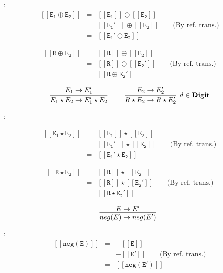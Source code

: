 \documentclass[a4paper,10pt]{article}
\newcommand{\Digit}{\mathbf{Digit}}
\newcommand{\denot}[1]{\mathtt{[[{#1}]]}}
\begin{document}
\begin{enumerate}
\proof:
\begin{eqnarray*}
\denot{E_{1} \oplus E_{2}}  
            & = &  \denot{E_{1}} \oplus \denot{E_{2}} \\
            & = &  \denot{E_{1}'} \oplus \denot{E_{2}}  
            \qquad \text{(By ref. trans.)}
            \\ 
            & = & \denot{E_{1}' \oplus E_{2}} 
\end{eqnarray*}

\begin{eqnarray*}
\denot{R \oplus E_{2}}  
            & = &  \denot{R} \oplus \denot{E_{2}} \\
            & = &  \denot{R} \oplus \denot{E_{2}'}  
            \qquad \text{(By ref. trans.)} \\
            & = & \denot{{R} \oplus E_{2}'} 
\end{eqnarray*}

\[
\infer[]
  {E_{1} \star E_{2} \rightarrow E_{1}' \star E_{2}}
  {E_{1} \rightarrow E_{1}'} \qquad
\infer[d \in \Digit]
  {R \star E_{2} \rightarrow R \star E_{2}'}
  {E_{2} \rightarrow E_{2}'}
\]

\proof:

\begin{eqnarray*}
\denot{E_{1} \star E_{2}}  
            & = &  \denot{E_{1}} \star \denot{E_{2}} \\
            & = &  \denot{E_{1}'} \star \denot{E_{2}} \qquad \text{(By ref. trans.)}\\  
            & = & \denot{E_{1}' \star E_{2}} 
\end{eqnarray*}


\begin{eqnarray*}
\denot{R \star E_{2}}  
            & = &  \denot{R} \star \denot{E_{2}} \\
            & = &  \denot{R} \star \denot{E_{2}'} \qquad \text{(By ref. trans.)}\\  
            & = & \denot{{R} \star E_{2}'} 
\end{eqnarray*}

\[
\infer[]
  {neg(E) \rightarrow neg(E')}
  {E \rightarrow E'}
\]

\proof:
\begin{eqnarray*}
\denot{neg(E)}  
            & = &  -\denot{E} \\
            & = &  -\denot{E'}  \qquad \text{(By ref. trans.)} \\
            & = & \denot{neg(E')} 
\end{eqnarray*}


\end{enumerate}
\end{document}
